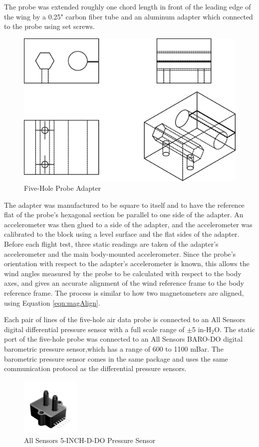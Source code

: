 The probe was extended roughly one chord length in front of the leading edge of the wing by a 0.25" carbon fiber tube and an aluminum adapter which connected to the probe using set screws.
\begin{figure}[H]
  \centering
    \includegraphics[width=.5\textwidth]{figures/probeAdapter.eps}
      \caption{Five-Hole Probe Adapter} \label{fig:probeAdapter}
\end{figure}
The adapter was manufactured to be square to itself and to have the reference flat of the probe's hexagonal section be parallel to one side of the adapter. An accelerometer was then glued to a side of the adapter, and the accelerometer was calibrated to the block using a level surface and the flat sides of the adapter. Before each flight test, three static readings are taken of the adapter's accelerometer and the main body-mounted accelerometer. Since the probe's orientation with respect to the adapter's accelerometer is known, this allows the wind angles measured by the probe to be calculated with respect to the body axes, and gives an accurate alignment of the wind reference frame to the body reference frame. The process is similar to how two magnetometers are aligned, using Equation \ref{eqn:magAlign}.

 Each pair of lines of the five-hole air data probe is connected to an All Sensors digital differential pressure sensor with a full scale range of $\pm$5 in-H$_2$O\cite{allsensorsDDO}. The static port of the five-hole probe was connected to an All Sensors BARO-DO digital barometric pressure sensor,which has a range of 600 to 1100 mBar\cite{allSensorsBaroDatasheet}. The barometric pressure sensor comes in the same package and uses the same communication protocol as the differential pressure sensors.

\begin{figure}[H]
  \centering
    \includegraphics[width=0.25\textwidth]{figures/allsensorsPressure.jpg}
      \caption{All Sensors 5-INCH-D-DO Pressure Sensor} \label{allsensorsPressurePic}
\end{figure}

